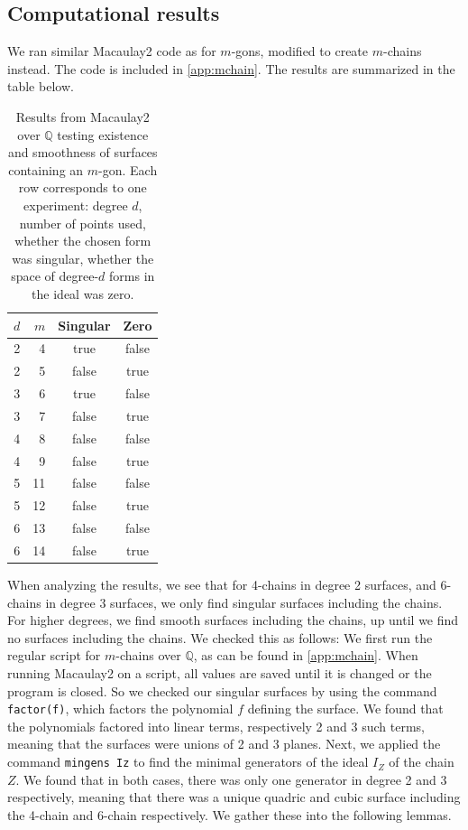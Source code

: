 \subsection{Computational results}
We ran similar Macaulay2 code as for $m$-gons, modified to create $m$-chains instead. The code is included in \cref{app:mchain}. The results are summarized in the table below.

\begin{table}
    \centering
    \caption{Results from Macaulay2 over $\mathbb{Q}$ testing existence and smoothness of surfaces containing an $m$-gon. Each row corresponds to one experiment: degree $d$, number of points used, whether the chosen form was singular, whether the space of degree-$d$ forms in the ideal was zero.}
    \label{tab:nchain-results-small}
    \small
    \begin{tabular}{r r c c }
        \toprule
        $d$ & $m$ & Singular & Zero  \\
        \midrule
        2 & 4  & true & false \\
        2 & 5  & false & true  \\
        3 & 6  & true & false \\
        3 & 7  & false & true  \\
        4 & 8  & false & false \\
        4 & 9  & false & true  \\
        5 & 11 & false & false \\
        5 & 12 & false & true  \\
        6 & 13 & false & false \\
        6 & 14 & false & true  \\
        \bottomrule
    \end{tabular}
\end{table}

When analyzing the results, we see that for 4-chains in degree 2 surfaces, and 6-chains in degree 3 surfaces, we only find singular surfaces including the chains. For higher degrees, we find smooth surfaces including the chains, up until we find no surfaces including the chains. We checked this as follows: We first run the regular script for $m$-chains over $\mathbb{Q}$, as can be found in \cref{app:mchain}. When running Macaulay2 on a script, all values are saved until it is changed or the program is closed. So we checked our singular surfaces by using the command \texttt{factor(f)}, which factors the polynomial $f$ defining the surface. We found that the polynomials factored into linear terms, respectively 2 and 3 such terms, meaning that the surfaces were unions of 2 and 3 planes. Next, we applied the command \texttt{mingens Iz} to find the minimal generators of the ideal $I_Z$ of the chain $Z$. We found that in both cases, there was only one generator in degree 2 and 3 respectively, meaning that there was a unique quadric and cubic surface including the 4-chain and 6-chain respectively. We gather these into the following lemmas.

